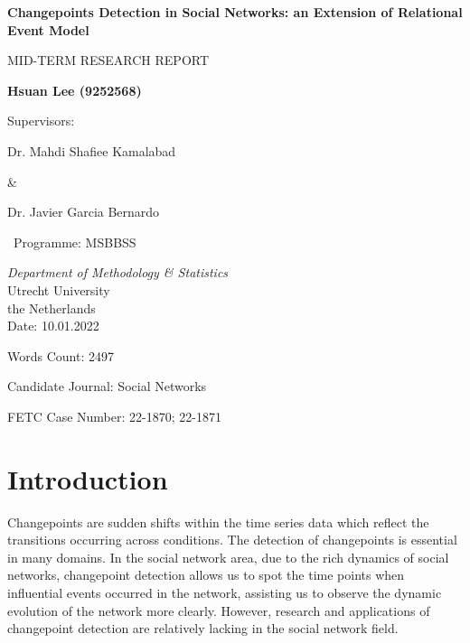 \documentclass[]{interact}
\theoremstyle{plain}%
\theoremstyle{definition}
\theoremstyle{remark}
\begin{document}
\begin{titlepage}
	\begin{center}
		\vspace*{0.3cm}
		
		\Huge
		\textbf{Changepoints Detection in Social Networks: an Extension of Relational Event Model}
		
		\vspace{1.8cm}
		\LARGE
		MID-TERM RESEARCH REPORT
		
		\vspace{1.8cm}
		
		\textbf{Hsuan Lee (9252568)}
		
		\vspace{1cm}
		Supervisors: 
		
		\vspace{0.5cm}
		
		Dr. Mahdi Shafiee Kamalabad 
		
		\& 
		
		Dr. Javier Garcia Bernardo
		
		\vspace{2cm}
		\Large
		
		\ Programme: MSBBSS
		
		\vspace{0.3cm}
		
		\emph{Department of Methodology \& Statistics}\\
		
		\vspace{0.3cm}
		Utrecht University\\
		the Netherlands\\
		
		\vspace{1.5cm}    
		\Large
		Date: 10.01.2022
		
		Words Count: 2497
		
		Candidate Journal: Social Networks
		
		FETC Case Number: 22-1870; 22-1871
		
	\end{center}
\end{titlepage}


\section{\fontsize{14}{15}\selectfont Introduction}

\hspace{0.2cm} Changepoints are sudden shifts within the time series data which reflect the transitions occurring across conditions\cite{sharmaTrendAnalysisChange2016}\cite{aminikhanghahiSurveyMethodsTime2017}. The detection of changepoints is essential in many domains. In the social network area, due to the rich dynamics of social networks, changepoint detection allows us to spot the time points when influential events occurred in the network, assisting us to observe the dynamic evolution of the network more clearly. However, research and applications of changepoint detection are relatively lacking in the social network field.\\
\end{document}
